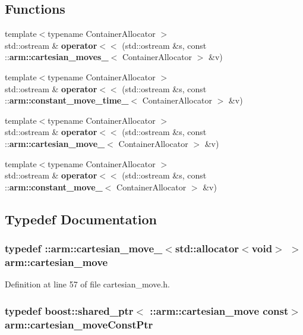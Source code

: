 \subsection*{\-Functions}
\begin{DoxyCompactItemize}
\item 
{\footnotesize template$<$typename Container\-Allocator $>$ }\\std\-::ostream \& {\bf operator$<$$<$} (std\-::ostream \&s, const \-::{\bf arm\-::cartesian\-\_\-moves\-\_\-}$<$ \-Container\-Allocator $>$ \&v)
\item 
{\footnotesize template$<$typename Container\-Allocator $>$ }\\std\-::ostream \& {\bf operator$<$$<$} (std\-::ostream \&s, const \-::{\bf arm\-::constant\-\_\-move\-\_\-time\-\_\-}$<$ \-Container\-Allocator $>$ \&v)
\item 
{\footnotesize template$<$typename Container\-Allocator $>$ }\\std\-::ostream \& {\bf operator$<$$<$} (std\-::ostream \&s, const \-::{\bf arm\-::cartesian\-\_\-move\-\_\-}$<$ \-Container\-Allocator $>$ \&v)
\item 
{\footnotesize template$<$typename Container\-Allocator $>$ }\\std\-::ostream \& {\bf operator$<$$<$} (std\-::ostream \&s, const \-::{\bf arm\-::constant\-\_\-move\-\_\-}$<$ \-Container\-Allocator $>$ \&v)
\end{DoxyCompactItemize}


\subsection{\-Typedef \-Documentation}
\subsubsection[{cartesian\-\_\-move}]{\setlength{\rightskip}{0pt plus 5cm}typedef \-::{\bf arm\-::cartesian\-\_\-move\-\_\-}$<$std\-::allocator$<$void$>$ $>$ {\bf arm\-::cartesian\-\_\-move}}\label{namespacearm_afb8ea802aa3cf9faec37b9e2ae1b1bd2}


\-Definition at line 57 of file cartesian\-\_\-move.\-h.

\subsubsection[{cartesian\-\_\-move\-Const\-Ptr}]{\setlength{\rightskip}{0pt plus 5cm}typedef boost\-::shared\-\_\-ptr$<$ \-::{\bf arm\-::cartesian\-\_\-move} const$>$ {\bf arm\-::cartesian\-\_\-move\-Const\-Ptr}}\label{namespacearm_aaec53288d825c03e3948adab7077f8cd}


